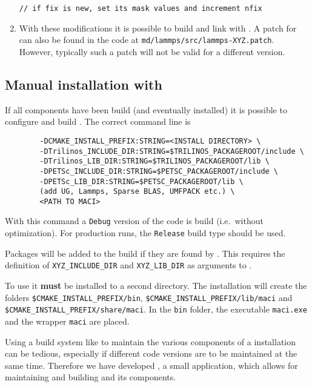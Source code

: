 \begin{enumerate}
\begin{lstlisting}[style=CODE_SMALL,frame=lines]
   // if fix is new, set its mask values and increment nfix
\end{lstlisting}
\item With these modifications it is possible to build \LAMMPS and link with \MACI. A patch for \LAMMPS can also be found in the \MACI code at \lstinline[style=SHELL]|md/lammps/src/lammps-XYZ.patch|. However, typically such a patch will not be valid for a different \LAMMPS version.
\end{enumerate}

\subsection{Manual installation with \CMAKE}

If all components have been build (and eventually installed) it is possible to configure and build \MACI. The correct command line is

\begin{lstlisting}[style=SHELL]
% cmake -DBUILD_SHARED_LIBS:BOOL=ON -DCMAKE_BUILD_TYPE:STRING=Debug \
        -DCMAKE_INSTALL_PREFIX:STRING=<INSTALL DIRECTORY> \
        -DTrilinos_INCLUDE_DIR:STRING=$TRILINOS_PACKAGEROOT/include \
        -DTrilinos_LIB_DIR:STRING=$TRILINOS_PACKAGEROOT/lib \
        -DPETSc_INCLUDE_DIR:STRING=$PETSC_PACKAGEROOT/include \
        -DPETSc_LIB_DIR:STRING=$PETSC_PACKAGEROOT/lib \
        (add UG, Lammps, Sparse BLAS, UMFPACK etc.) \
        <PATH TO MACI>
\end{lstlisting}

With this command a \lstinline[style=SHELL]|Debug| version of the code is build (i.e.~without optimization). For production runs, the \lstinline[style=SHELL]|Release| build type should be used.

Packages will be added to the build if they are found by \CMAKE. This requires the definition of \lstinline[style=SHELL]|XYZ_INCLUDE_DIR| and \lstinline[style=SHELL]|XYZ_LIB_DIR| as arguments to \CMAKE.

To use \MACI it \textbf{must} be installed to a second directory. The installation will create the folders \lstinline[style=SHELL]|$CMAKE_INSTALL_PREFIX/bin|, \lstinline[style=SHELL]|$CMAKE_INSTALL_PREFIX/lib/maci| and \lstinline[style=SHELL]|$CMAKE_INSTALL_PREFIX/share/maci|. In the \lstinline[style=SHELL]|bin| folder, the executable \lstinline[style=SHELL]|maci.exe| and the wrapper \lstinline[style=SHELL]|maci| are placed.

Using a build system like \CMAKE to maintain the various components of a \MACI installation can be tedious, especially if different code versions are to be maintained at the same time. Therefore we have developed \BUILDPY, a small application, which allows for maintaining and building \MACI and its components.

